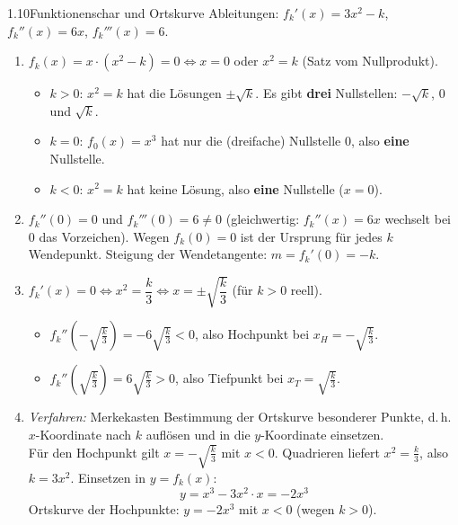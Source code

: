\begin{loesung}{1.10}{Funktionenschar und Ortskurve}
Ableitungen: $f_k'(x) = 3x^2-k$, $f_k''(x) = 6x$, $f_k'''(x) = 6$.
\begin{enumerate}[label=\alph*)]
  \item $f_k(x) = x\cdot(x^2-k) = 0 \Longleftrightarrow x=0$ oder $x^2=k$ (Satz vom Nullprodukt).
  \begin{itemize}
    \item $k>0$: $x^2=k$ hat die Lösungen $\pm\sqrt{k}$. Es gibt \textbf{drei} Nullstellen: $-\sqrt{k}$, $0$ und $\sqrt{k}$.
    \item $k=0$: $f_0(x) = x^3$ hat nur die (dreifache) Nullstelle $0$, also \textbf{eine} Nullstelle.
    \item $k<0$: $x^2=k$ hat keine Lösung, also \textbf{eine} Nullstelle ($x=0$).
  \end{itemize}
  \item $f_k''(0) = 0$ und $f_k'''(0) = 6\neq 0$ (gleichwertig: $f_k''(x)=6x$ wechselt bei $0$ das Vorzeichen). Wegen $f_k(0)=0$ ist der Ursprung für jedes $k$ Wendepunkt. Steigung der Wendetangente: $m = f_k'(0) = -k$.
  \item $f_k'(x) = 0 \Longleftrightarrow x^2 = \dfrac{k}{3} \Longleftrightarrow x = \pm\sqrt{\dfrac{k}{3}}$ (für $k>0$ reell).
  \begin{itemize}
    \item $f_k''\left(-\sqrt{\frac{k}{3}}\right) = -6\sqrt{\frac{k}{3}} < 0$, also Hochpunkt bei $x_H = -\sqrt{\frac{k}{3}}$.
    \item $f_k''\left(\sqrt{\frac{k}{3}}\right) = 6\sqrt{\frac{k}{3}} > 0$, also Tiefpunkt bei $x_T = \sqrt{\frac{k}{3}}$.
  \end{itemize}
  \item \textit{Verfahren:} Merkekasten \glqq Bestimmung der Ortskurve besonderer Punkte\grqq{}, d.\,h. $x$-Koordinate nach $k$ auflösen und in die $y$-Koordinate einsetzen.\\
  Für den Hochpunkt gilt $x = -\sqrt{\frac{k}{3}}$ mit $x<0$. Quadrieren liefert $x^2 = \frac{k}{3}$, also $k = 3x^2$. Einsetzen in $y = f_k(x)$:
  \[y = x^3 - 3x^2\cdot x = -2x^3\]
  Ortskurve der Hochpunkte: $y = -2x^3$ mit $x<0$ (wegen $k>0$).
\end{enumerate}
\end{loesung}


